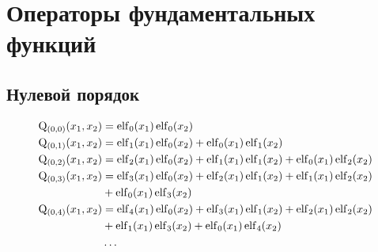 
\section{Операторы фундаментальных функций}

\subsection{Нулевой порядок}

\begin{equation*} \begin{aligned}
\mathrm{Q}_{(0,0)}(x_1, x_2) &=  
  \elf_0(x_1) \elf_0(x_2) \\
%
\mathrm{Q}_{(0,1)}(x_1, x_2) &=  
  \elf_1(x_1) \elf_0(x_2)
+ \elf_0(x_1) \elf_1(x_2) \\
%
\mathrm{Q}_{(0,2)}(x_1, x_2) &=  
  \elf_2(x_1) \elf_0(x_2)
+ \elf_1(x_1) \elf_1(x_2)
+ \elf_0(x_1) \elf_2(x_2) \\
%
\mathrm{Q}_{(0,3)}(x_1, x_2) &=  
  \elf_3(x_1) \elf_0(x_2)
+ \elf_2(x_1) \elf_1(x_2)
+ \elf_1(x_1) \elf_2(x_2) \\ &
+ \elf_0(x_1) \elf_3(x_2) \\
%
\mathrm{Q}_{(0,4)}(x_1, x_2) &=  
  \elf_4(x_1) \elf_0(x_2)
+ \elf_3(x_1) \elf_1(x_2)
+ \elf_2(x_1) \elf_2(x_2) \\ &
+ \elf_1(x_1) \elf_3(x_2)
+ \elf_0(x_1) \elf_4(x_2) \\
%
&\ldots \\
\end{aligned} \end{equation*}

